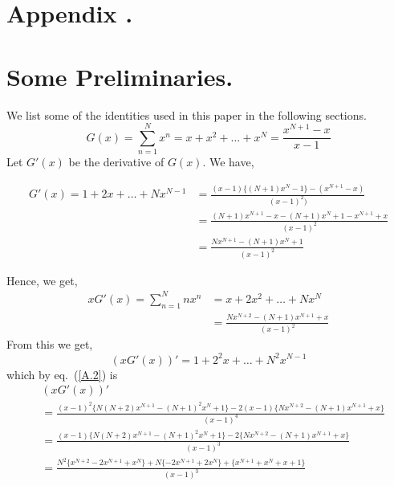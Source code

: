 \begin{multicols}{2}
\section*{Appendix .\label{section-app-a}}
\section*{Some Preliminaries.}\label{app-1}

We list some of the identities used in this paper in the following sections.
\begin{equation*}
G(x) = \displaystyle{\sum_{n=1}^{N}}x^n = x+x^2+\ldots+x^N = \displaystyle{\frac{x^{N+1}-x}{x-1}}\tag{A.1}\label{A.1}
\end{equation*}
Let $G'(x)$ be the derivative of $G(x)$. We have,

{\fontsize{7}{8}\selectfont\begin{align*}
G'(x) = 1+2x+\ldots+Nx^{N-1} &= \displaystyle{\frac{(x-1)\{(N+1)x^{N}-1\}- (x^{N+1}-x)}{(x-1)^2)}}\\
     &= \displaystyle{\frac{(N+1)x^{N+1}-x-(N+1)x^{N}+1-x^{N+1}+x}{(x-1)^2}}\\
     &= \displaystyle{\frac{Nx^{N+1}-(N+1)x^N + 1}{(x-1)^2}}
\end{align*}}

Hence, we get,
\begin{align*}
xG'(x) = \displaystyle{\sum_{n=1}^{N}}nx^n &= x+2x^2+\ldots+ Nx^N \nonumber\\
&=\displaystyle{\frac{Nx^{N+2}-(N+1)x^{N+1}+x}{(x-1)^2}}\tag{A.2}\label{A.2}
\end{align*}
From this we get,
\begin{equation*}
(xG'(x))' = 1+2^2x+\ldots+N^2x^{N-1}\tag{A.3}\label{eq-A.3}
\end{equation*}
which by eq.~(\ref{A.2}) is 
{\fontsize{6}{7}\selectfont
\begin{align*}
&\nonumber(xG'(x))' \\
&= \displaystyle{\frac{(x-1)^2\{N(N+2)x^{N+1}-(N+1)^2x^N+1\}-2(x-1)\{Nx^{N+2}-(N+1)x^{N+1}+x\}}{(x-1)^4}}\\
\nonumber&= \displaystyle{\frac{(x-1)\{N(N+2)x^{N+1}-(N+1)^2x^N+1\}-2\{Nx^{N+2}-(N+1)x^{N+1}+x\}}{(x-1)^3}}\\
\nonumber&= \displaystyle{\frac{N^2\{x^{N+2}-2x^{N+1}+x^N\}+ N\{-2x^{N+1}+2x^N\}+\{x^{N+1}+x^N+x+1\}}{(x-1)^3}}
\end{align*}}

\vspace{-.6cm}


\end{multicols}
